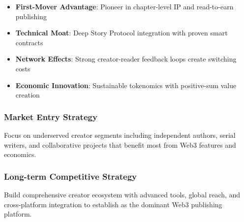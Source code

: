 \begin{itemize}
    \item \textbf{First-Mover Advantage}: Pioneer in chapter-level IP and read-to-earn publishing
    \item \textbf{Technical Moat}: Deep Story Protocol integration with proven smart contracts
    \item \textbf{Network Effects}: Strong creator-reader feedback loops create switching costs
    \item \textbf{Economic Innovation}: Sustainable tokenomics with positive-sum value creation
\end{itemize}

\subsubsection{Market Entry Strategy}

Focus on underserved creator segments including independent authors, serial writers, and collaborative projects that benefit most from Web3 features and economics.

\subsubsection{Long-term Competitive Strategy}

Build comprehensive creator ecosystem with advanced tools, global reach, and cross-platform integration to establish \storyhouse{} as the dominant Web3 publishing platform.